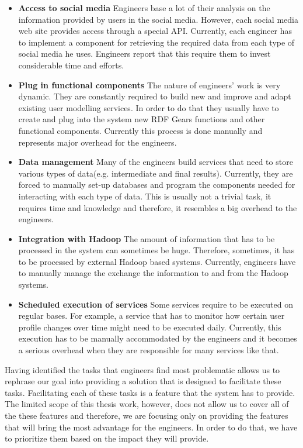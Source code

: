 \begin{itemize}

\item \textbf{Access to social media}
Engineers base a lot of their analysis on the information provided by users in the social media. However, each social media web site provides access through a special API. Currently, each engineer has to implement a component for retrieving the required data from each type of social media he uses. Engineers report that this require them to invest considerable time and efforts.

\item \textbf{Plug in functional components}
The nature of engineers' work is very dynamic. They are constantly required to build new and improve and adapt existing user modelling services. In order to do that they usually have to create and plug into the system new RDF Gears functions and other functional components. Currently this process is done manually and represents major overhead for the engineers.

\item \textbf{Data management} 
Many of the engineers build services that need to store various types of data(e.g. intermediate and final results). Currently, they are forced to manually set-up databases and program the components needed for interacting with each type of data. This is usually not a trivial task, it requires time and knowledge and therefore, it resembles a big overhead to the engineers.

 
\item \textbf{Integration with Hadoop}
The amount of information that has to be processed in the system can sometimes be huge. Therefore, sometimes, it has to be processed by external Hadoop based systems. Currently, engineers have to manually manage the exchange the information to and from the Hadoop systems.

\item \textbf{Scheduled execution of services}
Some services require to be executed on regular bases. For example, a service that has to monitor how certain user profile changes over time might need to be executed daily. Currently, this execution has to be manually accommodated by the engineers and it becomes a serious overhead when they are responsible for many services like that. 

\end{itemize}

Having identified the tasks that engineers find most problematic allows us to rephrase our goal into providing a solution that is designed to facilitate these tasks. Facilitating each of these tasks is a feature that the system has to provide. The limited scope of this thesis work, however, does not allow us to cover all of the these features and therefore, we are focusing only on providing the features that will bring the most advantage for the engineers. In order to do that, we have to prioritize them based on the impact they will provide. 

